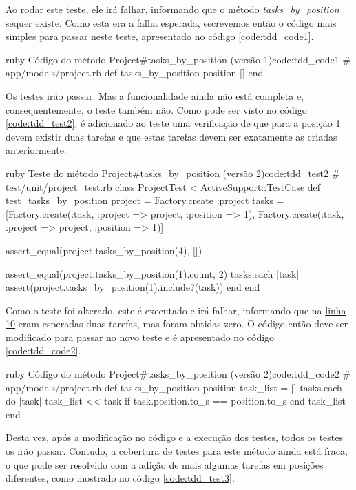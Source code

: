 Ao rodar este teste, ele irá falhar, informando que o método \textit{tasks\_by\_position} sequer existe. Como esta era a falha esperada, escrevemos então o código mais simples para passar neste teste, apresentado no código \ref{code:tdd_code1}.

\begin{mycode}{ruby}%
{Código do método Project\#tasks\_by\_position (versão 1)}{code:tdd_code1}
# app/models/project.rb
def tasks_by_position position
  []
end
\end{mycode}

Os testes irão passar. Mas a funcionalidade ainda não está completa e, consequentemente, o teste também não. Como pode ser visto no código \ref{code:tdd_test2}, é adicionado ao teste uma verificação de que para a posição 1 devem existir duas tarefas e que estas tarefas devem ser exatamente as criadas anteriormente.

\begin{mycode}{ruby}%
{Teste do método Project\#tasks\_by\_position (versão 2)}{code:tdd_test2}
# test/unit/project_test.rb
class ProjectTest < ActiveSupport::TestCase
  def test_tasks_by_position
    project = Factory.create :project
    tasks = [Factory.create(:task, :project => project, :position => 1),
             Factory.create(:task, :project => project, :position => 1)]

    assert_equal(project.tasks_by_position(4), [])

    assert_equal(project.tasks_by_position(1).count, 2)
    tasks.each { |task| assert(project.tasks_by_position(1).include?(task)) }
  end
end
\end{mycode}

Como o teste foi alterado, este é executado e irá falhar, informando que na \hyperref[code:tdd_test1]{linha 10} eram esperadas duas tarefas, mas foram obtidas zero. O código então deve ser modificado para passar no novo teste e é apresentado no código \ref{code:tdd_code2}.

\begin{mycode}{ruby}%
{Código do método Project\#tasks\_by\_position (versão 2)}{code:tdd_code2}
# app/models/project.rb
def tasks_by_position position
  task_list = []
  tasks.each do |task|
    task_list << task if task.position.to_s == position.to_s
  end
  task_list
end
\end{mycode}

Desta vez, após a modificação no código e a execução dos testes, todos os testes os irão passar. Contudo, a cobertura de testes para este método ainda está fraca, o que pode ser resolvido com a adição de mais algumas tarefas em posições diferentes, como mostrado no código \ref{code:tdd_test3}.

